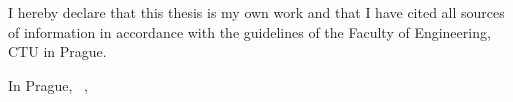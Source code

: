 \begin{declaration}
I hereby declare that this thesis is my own work and that I have cited all sources of information in accordance with the guidelines of the Faculty of Engineering, CTU in Prague.

In Prague,~ ,~
\end{declaration}